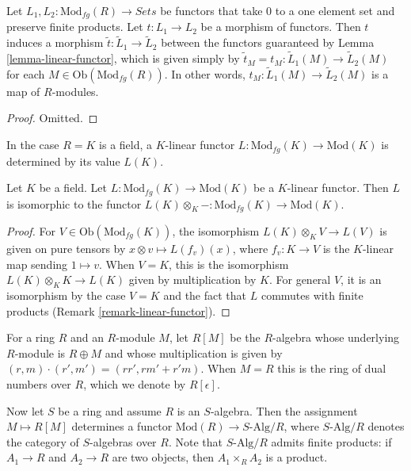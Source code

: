 \begin{lemma}
\label{lemma-morphism-linear-functors}
Let $L_1, L_2: \text{Mod}_{fg}(R) \to \textit{Sets}$ be 
functors that take $0$ to a one element set and preserve finite products.
Let $t : L_1 \to L_2$ be a morphism of functors. Then $t$ induces a morphism
$\widetilde{t} : \widetilde{L}_1 \to \widetilde{L}_2$ between the 
functors guaranteed by Lemma \ref{lemma-linear-functor}, which is given simply
by $\widetilde{t}_M = t_M: \widetilde{L}_1(M) \to \widetilde{L}_2(M)$ 
for each $M \in \text{Ob}(\text{Mod}_{fg}(R))$. In other words, 
$t_M: \widetilde{L}_1(M) \to \widetilde{L}_2(M)$ is a map of $R$-modules.
\end{lemma}

\begin{proof}
Omitted.
\end{proof}

\noindent
In the case $R = K$ is a field, a $K$-linear functor
$L : \text{Mod}_{fg}(K) \to \text{Mod}(K)$ is determined by its value $L(K)$.

\begin{lemma}
\label{lemma-linear-functor-over-field}
Let $K$ be a field. Let $L: \text{Mod}_{fg}(K) \to 
\text{Mod}(K)$ be a $K$-linear functor.  Then $L$ is isomorphic to the 
functor $L(K) \otimes_{K} - : \text{Mod}_{fg}(K) \to 
\text{Mod}(K)$.
\end{lemma}

\begin{proof}
For $V \in \text{Ob}(\text{Mod}_{fg}(K))$, the isomorphism
$L(K) \otimes_{K} V \to L(V)$ is given on pure tensors by
$x \otimes v \mapsto L(f_{v})(x)$, where $f_{v}: K \to V$ is the $K$-linear map
sending $1 \mapsto v$.  When $V = K$, this is the isomorphism
$L(K) \otimes_K K \to L(K)$ given by multiplication by $K$.
For general $V$, it is an isomorphism by the case $V = K$ and the
fact that $L$ commutes with finite 
products (Remark \ref{remark-linear-functor}).
\end{proof}

\noindent 
For a ring $R$ and an $R$-module $M$, let $R[M]$ be the $R$-algebra whose 
underlying $R$-module is $R \oplus M$ and whose multiplication is given by 
$(r,m) \cdot (r',m') = (rr', rm' + r'm)$.  When $M = R$ this is the ring of 
dual numbers over $R$, which we denote by $R[\epsilon]$.  

\medskip \noindent
Now let $S$ be a ring and assume $R$ is an $S$-algebra.
Then the assignment $M \mapsto R[M]$ determines a functor
$\text{Mod}(R) \to S\text{-Alg}/R$, where $S\text{-Alg}/R$
denotes the category of $S$-algebras over $R$. Note that
$S\text{-Alg}/R$ admits finite products: if $A_1 \to R$ and
$A_2 \to R$ are two objects, then $A_1 \times_R A_2$ is a product.

